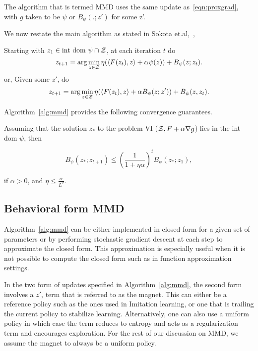 The algorithm that is termed MMD uses the same update as~\ref{eqn:proxgrad}, with $g$ taken to be
$\psi$ or $B_{\psi}(.
	;z')$ for some z'.

We now restate the main algorithm as stated in Sokota et.al,~\cite{sokotaUnified2023},

\begin{alprocedure}[H]  \label{alg:mmd} Starting with $z_1 \in \text{int dom } \psi \cap \mathcal{Z}$,
	at each iteration $t$ do $$ z_{t+1} = \arg \min_{z \in \mathcal{Z}} \eta (\langle F(z_t), z\rangle +
		\alpha \psi(z)) + B_{\psi} (z; z_t).
	$$
	or,
	Given some $z'$, do $$ z_{t+1} = \arg \min_{z \in \mathcal{Z}} \eta (\langle F(z_t), z\rangle + \alpha
		B_{\psi}(z; z')) + B_{\psi} (z, z_t).
	$$
\end{alprocedure}

\hfill \break
Algorithm~\ref{alg:mmd} provides the following convergence guarantees.

\begin{theorem}
	\label{thm:mmdconv}
	\cite[Theorem 3.4]{sokotaUnified2023}
	Assuming that the solution $z_{\ast}$ to the problem VI ($\mathcal{Z}, F + \alpha \nabla g$) lies in the
	int dom $\psi$, then

	\[ B_{\psi} (z_{\ast}; z_{t + 1}) \leq {\left(\frac{1}{1 +
				\eta \alpha}\right)}^t B_{\psi} (z_{\ast}; z_1), \]

	if $\alpha > 0$, and $\eta
		\leq \frac{\alpha}{L^2}$.
\end{theorem}

\subsection{Behavioral form MMD}

Algorithm~\ref{alg:mmd} can be either implemented in closed form for a given set of parameters or
by performing stochastic gradient descent at each step to approximate the closed form.
This approximation is especially useful when it is not possible to compute the closed form such as
in function approximation settings.

In the two form of updates specified in Algorithm~\ref{alg:mmd}, the second form involves a $z'$,
term that is referred to as the magnet.
This can either be a reference policy such as the ones used in Imitation learning, or one that is
trailing the current policy to stabilize learning.
Alternatively, one can also use a uniform policy in which case the term reduces to entropy and acts
as a regularization term and encourages exploration.
For the rest of our discussion on MMD, we assume the magnet to always be a uniform policy.

